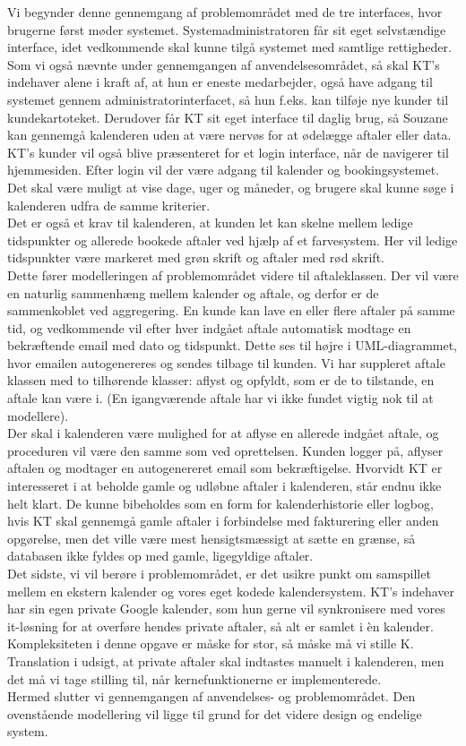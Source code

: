\documentclass[12pt]{article}   %
\begin{document}
Vi begynder denne gennemgang af problemområdet med de tre interfaces, hvor
brugerne først møder systemet. Systemadministratoren får sit eget selvstændige
interface, idet vedkommende skal kunne tilgå systemet med samtlige
rettigheder. Som vi også nævnte under gennemgangen af anvendelsesområdet, så
skal KT's indehaver alene i kraft af, at hun er eneste medarbejder, også have
adgang til systemet gennem administratorinterfacet, så hun f.eks. kan
tilføje nye kunder til kundekartoteket. Derudover får KT sit eget interface
til daglig brug, så Souzane kan gennemgå kalenderen uden at være nervøs for at
ødelægge aftaler eller data. KT's kunder vil også blive præsenteret
for et login interface, når de navigerer til hjemmesiden. Efter login vil der 
være adgang til kalender og bookingsystemet. Det skal være muligt at vise dage, 
uger og måneder, og brugere skal kunne søge i kalenderen udfra de samme
kriterier.\\
Det er også et krav til kalenderen, at kunden let kan skelne mellem ledige
tidspunkter og allerede bookede aftaler ved hjælp af et farvesystem. Her vil
ledige tidspunkter være markeret med grøn skrift og aftaler med rød skrift. \\
Dette fører modelleringen af problemområdet videre til aftaleklassen. Der vil 
være en naturlig sammenhæng mellem kalender og aftale, og derfor er de
sammenkoblet ved aggregering. En kunde kan lave en eller flere aftaler på
samme tid, og vedkommende vil efter hver indgået aftale automatisk modtage en 
bekræftende email med dato og tidspunkt. Dette ses til højre i UML-diagrammet,
hvor emailen autogenereres og sendes tilbage til kunden. Vi har suppleret aftale
klassen med to tilhørende klasser: aflyst og opfyldt, som er de to tilstande,
en aftale kan være i. (En igangværende aftale har vi ikke fundet vigtig nok
til at modellere).\\
Der skal i kalenderen være mulighed for at aflyse en
allerede indgået aftale, og proceduren vil være den samme som ved oprettelsen.
Kunden logger på, aflyser aftalen og modtager en autogenereret email som
bekræftigelse. Hvorvidt KT er interesseret i at beholde gamle og udløbne aftaler 
i kalenderen, står endnu ikke helt klart. De kunne bibeholdes som en form for
kalenderhistorie eller logbog, hvis KT skal gennemgå gamle aftaler i
forbindelse med fakturering eller anden opgørelse, men det ville være mest
hensigtsmæssigt at sætte en grænse, så databasen ikke fyldes op med gamle,
ligegyldige aftaler.\\ 
Det sidste, vi vil berøre i problemområdet, er det usikre punkt om samspillet
mellem en ekstern kalender og vores eget kodede kalendersystem. KT's indehaver
har sin egen private Google kalender, som hun gerne vil synkronisere med vores
it-løsning for at overføre hendes private aftaler, så alt er samlet i èn
kalender. Kompleksiteten i denne opgave er måske for stor, så måske må
vi stille K. Translation i udsigt, at private aftaler skal indtastes manuelt i
kalenderen, men det må vi tage stilling til, når kernefunktionerne er
implementerede. \\
Hermed slutter vi gennemgangen af anvendelses- og problemområdet. Den
ovenstående modellering vil ligge til grund for det videre design og endelige
system. 
\end{document}
